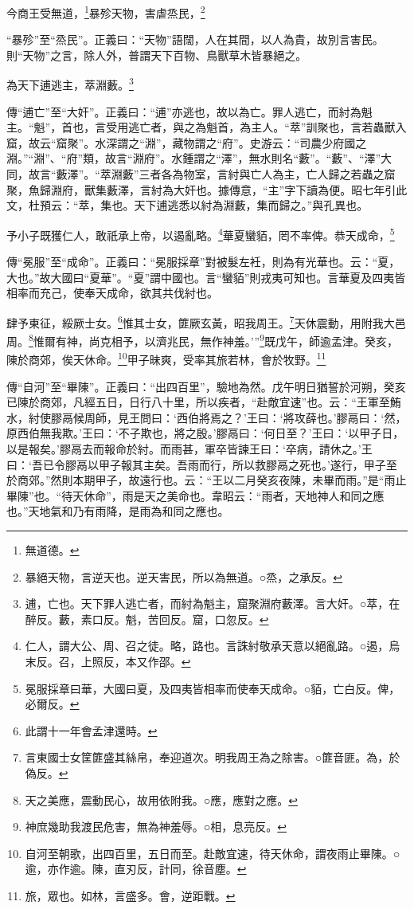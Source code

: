 今商王受無道，\footnote{無道德。}暴殄天物，害虐烝民，\footnote{暴絕天物，言逆天也。逆天害民，所以為無道。○烝，之承反。}

{\noindent\shu{}\fzkt “暴殄”至“烝民”。正義曰：“天物”語闊，人在其間，以人為貴，故別言害民。則“天物”之言，除人外，普謂天下百物、鳥獸草木皆暴絕之。 \par}

為天下逋逃主，萃淵藪。\footnote{逋，亡也。天下罪人逃亡者，而紂為魁主，窟聚淵府藪澤。言大奸。○萃，在醉反。藪，素口反。魁，苦回反。窟，口忽反。}

{\noindent\zhuan{}\fzbyks 傳“逋亡”至“大奸”。正義曰：“逋”亦逃也，故以為亡。罪人逃亡，而紂為魁主。“魁”，首也，言受用逃亡者，與之為魁首，為主人。“萃”訓聚也，言若蟲獸入窟，故云“窟聚”。水深謂之“淵”，藏物謂之“府”。史游云：“司農少府國之淵。”“淵”、“府”類，故言“淵府”。水鍾謂之“澤”，無水則名“藪”。“藪”、“澤”大同，故言“藪澤”。“萃淵藪”三者各為物室，言紂與亡人為主，亡人歸之若蟲之窟聚，魚歸淵府，獸集藪澤，言紂為大奸也。據傳意，“主”字下讀為便。昭七年引此文，杜預云：“萃，集也。天下逋逃悉以紂為淵藪，集而歸之。”與孔異也。 \par}

予小子既獲仁人，敢祇承上帝，以遏亂略。\footnote{仁人，謂大公、周、召之徒。略，路也。言誅紂敬承天意以絕亂路。○遏，烏末反。召，上照反，本又作邵。}華夏蠻貊，罔不率俾。恭天成命，\footnote{冕服採章曰華，大國曰夏，及四夷皆相率而使奉天成命。○貊，亡白反。俾，必爾反。}

{\noindent\zhuan{}\fzbyks 傳“冕服”至“成命”。正義曰：“冕服採章”對被髮左衽，則為有光華也。云：“夏，大也。”故大國曰“夏華”。“夏”謂中國也。言“蠻貊”則戎夷可知也。言華夏及四夷皆相率而充己，使奉天成命，欲其共伐紂也。 \par}

肆予東征，綏厥士女。\footnote{此謂十一年會孟津還時。}惟其士女，篚厥玄黃，昭我周王。\footnote{言東國士女筐篚盛其絲帛，奉迎道次。明我周王為之除害。○篚音匪。為，於偽反。}天休震動，用附我大邑周。\footnote{天之美應，震動民心，故用依附我。○應，應對之應。}惟爾有神，尚克相予，以濟兆民，無作神羞。’”\footnote{神庶幾助我渡民危害，無為神羞辱。○相，息亮反。}既戊午，師逾孟津。癸亥，陳於商郊，俟天休命。\footnote{自河至朝歌，出四百里，五日而至。赴敵宜速，待天休命，謂夜雨止畢陳。○逾，亦作逾。陳，直刃反，計同，徐音塵。}甲子昧爽，受率其旅若林，會於牧野。\footnote{旅，眾也。如林，言盛多。會，逆距戰。}



{\noindent\zhuan{}\fzbyks 傳“自河”至“畢陳”。正義曰：“出四百里”，驗地為然。戊午明日猶誓於河朔，癸亥已陳於商郊，凡經五日，日行八十里，所以疾者，“赴敵宜速”也。云：“王軍至鮪水，紂使膠鬲候周師，見王問曰：‘西伯將焉之？’王曰：‘將攻薛也。’膠鬲曰：‘然，原西伯無我欺。’王曰：‘不子欺也，將之殷。’膠鬲曰：‘何日至？’王曰：‘以甲子日，以是報矣。’膠鬲去而報命於紂。而雨甚，軍卒皆諫王曰：‘卒病，請休之。’王曰：‘吾已令膠鬲以甲子報其主矣。吾雨而行，所以救膠鬲之死也。’遂行，甲子至於商郊。”然則本期甲子，故遠行也。云：“王以二月癸亥夜陳，未畢而雨。”是“雨止畢陳”也。“待天休命”，雨是天之美命也。韋昭云：“雨者，天地神人和同之應也。”天地氣和乃有雨降，是雨為和同之應也。 \par}

